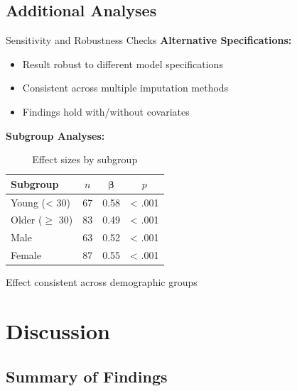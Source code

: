 \documentclass[aspectratio=169,11pt]{beamer}
\begin{document}
\subsection{Additional Analyses}

\begin{frame}{Sensitivity and Robustness Checks}
  \textbf{Alternative Specifications:}
  \begin{itemize}
    \item Result robust to different model specifications
    \item Consistent across multiple imputation methods
    \item Findings hold with/without covariates
  \end{itemize}
  
  \vspace{0.5cm}
  
  \textbf{Subgroup Analyses:}
  \begin{table}
    \centering
    \caption{Effect sizes by subgroup}
    \small
    \begin{tabular}{lccc}
      \toprule
      \textbf{Subgroup} & \textbf{$n$} & $\boldsymbol{\beta}$ & \textbf{$p$} \\
      \midrule
      Young (< 30) & 67 & 0.58 & < .001 \\
      Older ($\geq$ 30) & 83 & 0.49 & < .001 \\
      Male & 63 & 0.52 & < .001 \\
      Female & 87 & 0.55 & < .001 \\
      \bottomrule
    \end{tabular}
  \end{table}
  
  Effect consistent across demographic groups
\end{frame}


\section{Discussion}

\subsection{Summary of Findings}
\end{document}
